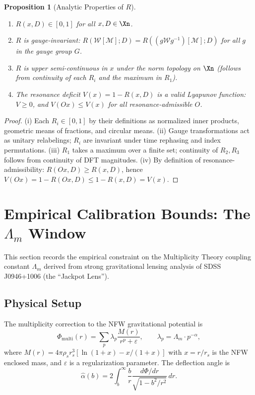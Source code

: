 \documentclass[11pt]{amsart}
\newtheorem{proposition}[theorem]{Proposition}
\newcommand{\M}{\mathcal{M}}
\begin{document}
\begin{proposition}[Analytic Properties of $R$]\label{prop:R-properties}
\begin{enumerate}
  \item[(i)] $R(x,D) \in [0,1]$ for all $x, D \in \Xn$.
  \item[(ii)] $R$ is gauge-invariant: $R(\mathcal{W}[\M]; D) = R((g\mathcal{W}g^{-1})[\M]; D)$ for all $g$ in the gauge group $G$.
  \item[(iii)] $R$ is upper semi-continuous in $x$ under the norm topology on $\Xn$ (follows from continuity of each $R_i$ and the maximum in $R_1$).
  \item[(iv)] The resonance deficit $V(x) = 1 - R(x,D)$ is a valid Lyapunov function: $V \geq 0$, and $V(Ox) \leq V(x)$ for all resonance-admissible $O$.
\end{enumerate}
\end{proposition}

\begin{proof}
(i) Each $R_i \in [0,1]$ by their definitions as normalized inner products, geometric means of fractions, and circular means. (ii) Gauge transformations act as unitary relabelings; $R_i$ are invariant under time rephasing and index permutations. (iii) $R_1$ takes a maximum over a finite set; continuity of $R_2, R_3$ follows from continuity of DFT magnitudes. (iv) By definition of resonance-admissibility: $R(Ox, D) \geq R(x, D)$, hence $V(Ox) = 1 - R(Ox,D) \leq 1 - R(x,D) = V(x)$.
\end{proof}

\section{Empirical Calibration Bounds: The $\Lambda_m$ Window}
\label{sec:empirical}

This section records the empirical constraint on the Multiplicity Theory coupling constant $\Lambda_m$ derived from strong gravitational lensing analysis of SDSS J0946+1006 (the ``Jackpot Lens'').

\subsection{Physical Setup}

The multiplicity correction to the NFW gravitational potential is
\[
  \Phi_{\mathrm{multi}}(r) = \sum_p \lambda_p \frac{M(r)}{r^p + \varepsilon}, \qquad \lambda_p = \Lambda_m \cdot p^{-\alpha},
\]
where $M(r) = 4\pi\rho_s r_s^3[\ln(1+x) - x/(1+x)]$ with $x = r/r_s$ is the NFW enclosed mass, and $\varepsilon$ is a regularization parameter. The deflection angle is
\[
  \hat{\alpha}(b) = 2\int_b^\infty \frac{b}{r} \frac{d\Phi/dr}{\sqrt{1 - b^2/r^2}}\,dr.
\]
\end{document}
